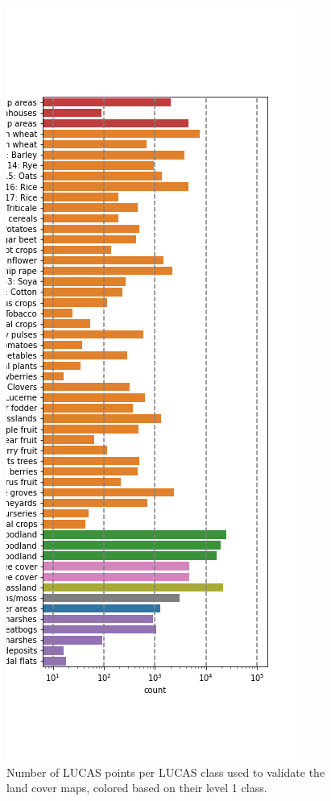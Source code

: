 \begin{figure}[h]
    \centering
    \includegraphics[width=\textwidth]{figs_05/fig_lucas_aoi_counts.png}
    \caption{Number of LUCAS points per LUCAS class used to validate the land cover maps, colored based on their level 1 class.}
    \label{fig:05_lucas_aoi_counts}
\end{figure}


